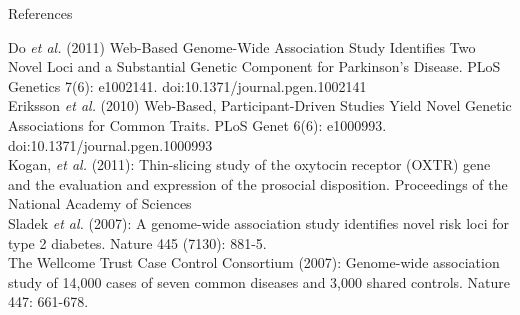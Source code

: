 \documentclass[12pt,a4paper]{beamer}
\begin{document}
\begin{frame}{References}
\begin{tiny}
Do \textit{et al.} (2011) Web-Based Genome-Wide Association Study Identifies Two Novel Loci and a Substantial Genetic Component for Parkinson's Disease. PLoS Genetics 7(6): e1002141. doi:10.1371/journal.pgen.1002141 \\
Eriksson \textit{et al.} (2010) Web-Based, Participant-Driven Studies Yield Novel Genetic Associations for Common Traits. PLoS Genet 6(6): e1000993. doi:10.1371/journal.pgen.1000993\\
Kogan, \textit{et al.} (2011): Thin-slicing study of the oxytocin receptor (OXTR) gene and the evaluation and expression of the prosocial disposition. Proceedings of the National Academy of Sciences\\
Sladek \textit{et al.} (2007): A genome-wide association study identifies novel risk loci for type 2 diabetes. Nature 445 (7130): 881-5. \\
The Wellcome Trust Case Control Consortium  (2007): Genome-wide association study of 14,000 cases of seven common diseases and 3,000 shared controls. Nature 447: 661-678.\\
\end{tiny}
\end{frame}
\end{document}
